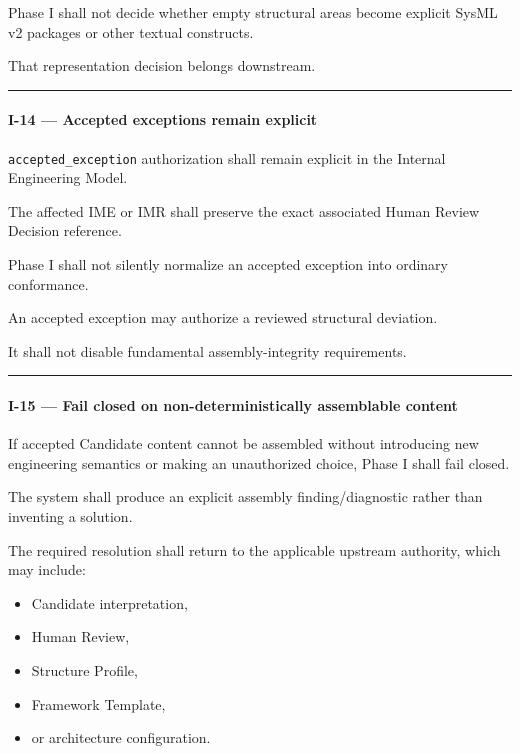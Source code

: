 Phase I shall not decide whether empty structural areas become explicit SysML v2 packages or other textual constructs.

That representation decision belongs downstream.

\begin{center}\rule{0.5\linewidth}{0.5pt}\end{center}

\hypertarget{i-14--accepted-exceptions-remain-explicit}{%
\paragraph{I-14 --- Accepted exceptions remain explicit}\label{i-14--accepted-exceptions-remain-explicit}}

\texttt{accepted\_exception} authorization shall remain explicit in the Internal Engineering Model.

The affected IME or IMR shall preserve the exact associated Human Review Decision reference.

Phase I shall not silently normalize an accepted exception into ordinary conformance.

An accepted exception may authorize a reviewed structural deviation.

It shall not disable fundamental assembly-integrity requirements.

\begin{center}\rule{0.5\linewidth}{0.5pt}\end{center}

\hypertarget{i-15--fail-closed-on-non-deterministically-assemblable-content}{%
\paragraph{I-15 --- Fail closed on non-deterministically assemblable content}\label{i-15--fail-closed-on-non-deterministically-assemblable-content}}

If accepted Candidate content cannot be assembled without introducing new engineering semantics or making an unauthorized choice, Phase I shall fail closed.

The system shall produce an explicit assembly finding/diagnostic rather than inventing a solution.

The required resolution shall return to the applicable upstream authority, which may include:

\begin{itemize}
\tightlist
\item
  Candidate interpretation,
\item
  Human Review,
\item
  Structure Profile,
\item
  Framework Template,
\item
  or architecture configuration.
\end{itemize}


